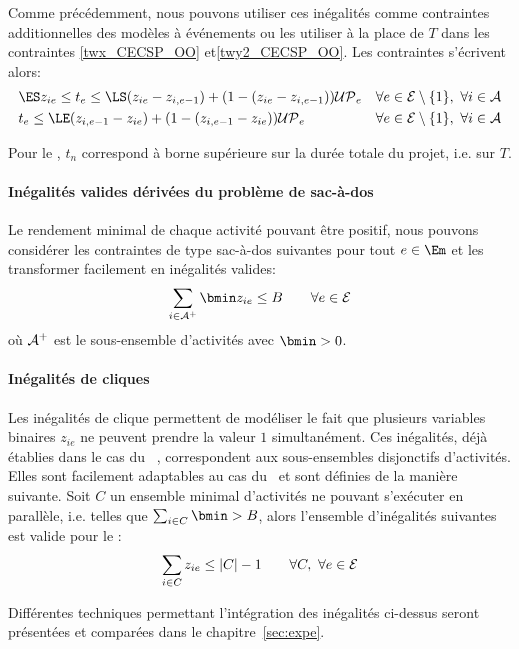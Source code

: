 Comme précédemment, nous pouvons utiliser ces inégalités comme
contraintes additionnelles des modèles à événements ou les utiliser
à la place de  $T$ dans les contraintes \eqref{twx_CECSP_OO}
et\eqref{twy2_CECSP_OO}. Les contraintes s'écrivent alors: 
\begin{align*}
& \ES z_{ie}\le t_e \le \LS(z_{ie}-z_{i,e-1})+(1-(z_{ie}-z_{i,e-1})){\cal UP}_e 
 & & \forall e \in \E\setminus \{1\},\ \forall i \in {\cal
   A}\\
&t_e \le \LE(z_{i,e-1}-z_{ie})+(1-(z_{i,e-1}-z_{ie})){\cal UP}_e  & & \forall e
 \in \E\setminus \{1\},\ \forall i \in {\cal
   A}
\end{align*}

Pour le \RCPSP, $t_n$ correspond à borne supérieure sur la durée
totale du projet, i.e. sur $T$.

\paragraph{Inégalités valides dérivées du problème de sac-à-dos}

Le rendement minimal de chaque activité pouvant être positif, nous
pouvons considérer les contraintes de type sac-à-dos suivantes pour
tout $e \in \Em$ et les transformer facilement en inégalités valides: 
\begin{equation}
\sum_{i\in \A^+} \bmin z_{ie} \leq B  \qquad  \forall e \in \E
\end{equation}
où ${\cal A}^+$ est le sous-ensemble d'activités avec $\bmin > 0$. 


\paragraph{Inégalités de cliques}

Les inégalités de clique permettent de modéliser le fait que plusieurs
variables binaires $z_{ie}$ ne peuvent prendre la valeur $1$
simultanément. Ces inégalités, déjà établies dans le cas du
\RCPSP~\cite{CAVT_clique}, correspondent aux sous-ensembles
disjonctifs d'activités. Elles sont facilement adaptables au cas du
\CECSP~et sont définies de la manière suivante. Soit $C$ un ensemble
minimal d'activités ne pouvant s'exécuter en parallèle, i.e. telles que
$\sum_{i \in C} \bmin > B$, alors l'ensemble d'inégalités suivantes
est valide pour le \CECSP: 
\begin{equation} 
\sum_{i\in C} z_{ie}  \le |C| -1 \qquad \forall C,\ \forall e \in {\cal E}
\end{equation}


Différentes techniques permettant l'intégration des inégalités
ci-dessus seront présentées et comparées dans le
chapitre~\ref{sec:expe}.